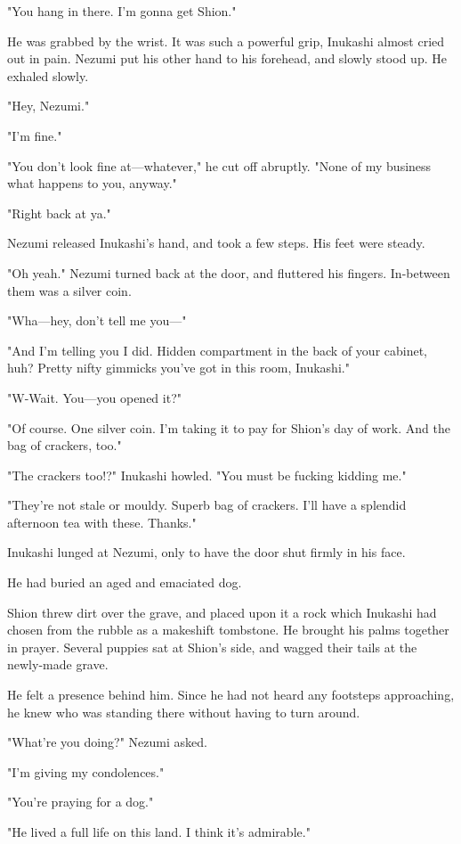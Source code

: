 "You hang in there. I'm gonna get Shion."

He was grabbed by the wrist. It was such a powerful grip, Inukashi
almost cried out in pain. Nezumi put his other hand to his forehead, and
slowly stood up. He exhaled slowly.

"Hey, Nezumi."

"I'm fine."

"You don't look fine at---whatever," he cut off abruptly. "None of my
business what happens to you, anyway."

"Right back at ya."

Nezumi released Inukashi's hand, and took a few steps. His feet were
steady.

"Oh yeah." Nezumi turned back at the door, and fluttered his fingers.
In-between them was a silver coin.

"Wha---hey, don't tell me you---"

"And I'm telling you I did. Hidden compartment in the back of your
cabinet, huh? Pretty nifty gimmicks you've got in this room, Inukashi."

"W-Wait. You---you opened it?"

"Of course. One silver coin. I'm taking it to pay for Shion's day of
work. And the bag of crackers, too."

"The crackers too!?" Inukashi howled. "You must be fucking kidding me."

"They're not stale or mouldy. Superb bag of crackers. I'll have a
splendid afternoon tea with these. Thanks."

Inukashi lunged at Nezumi, only to have the door shut firmly in his
face.

\mybreak

He had buried an aged and emaciated dog.

Shion threw dirt over the grave, and placed upon it a rock which
Inukashi had chosen from the rubble as a makeshift tombstone. He brought
his palms together in prayer. Several puppies sat at Shion's side, and
wagged their tails at the newly-made grave.

He felt a presence behind him. Since he had not heard any footsteps
approaching, he knew who was standing there without having to turn
around.

"What're you doing?" Nezumi asked.

"I'm giving my condolences."

"You're praying for a dog."

"He lived a full life on this land. I think it's admirable."

